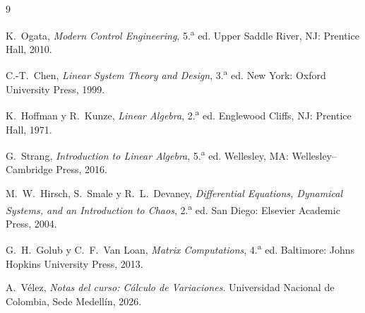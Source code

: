 \documentclass[11pt,letterpaper]{article}
\theoremstyle{definition}
\theoremstyle{plain}
\theoremstyle{remark}
\begin{document}
\begin{thebibliography}{9}

K.~Ogata, \emph{Modern Control Engineering}, 5.\textsuperscript{a} ed.
Upper Saddle River, NJ: Prentice Hall, 2010.

C.-T.~Chen, \emph{Linear System Theory and Design}, 3.\textsuperscript{a} ed.
New York: Oxford University Press, 1999.

K.~Hoffman y R.~Kunze, \emph{Linear Algebra}, 2.\textsuperscript{a} ed.
Englewood Cliffs, NJ: Prentice Hall, 1971.

G.~Strang, \emph{Introduction to Linear Algebra}, 5.\textsuperscript{a} ed.
Wellesley, MA: Wellesley--Cambridge Press, 2016.

M.~W.~Hirsch, S.~Smale y R.~L.~Devaney, \emph{Differential Equations,
Dynamical Systems, and an Introduction to Chaos}, 2.\textsuperscript{a} ed.
San Diego: Elsevier Academic Press, 2004.

G.~H.~Golub y C.~F.~Van Loan, \emph{Matrix Computations},
4.\textsuperscript{a} ed. Baltimore: Johns Hopkins University Press, 2013.

A.~Vélez, \emph{Notas del curso: Cálculo de Variaciones}. Universidad Nacional de Colombia, Sede Medellín, 2026.

\end{thebibliography}
\end{document}

